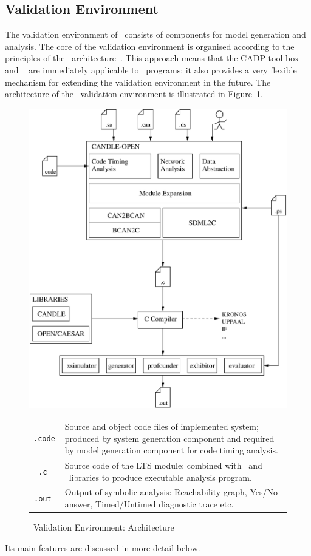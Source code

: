 \subsection{Validation Environment}
The validation environment of \candle\ consists of components for
model generation and analysis. The core of the validation environment is
organised according to the principles of the \opencaesar\
architecture~\cite{gar:98}. This approach means that 
the CADP tool box~\cite{fgk:96} and 
\openkronos~\cite{tri:98} are immediately applicable to \candle\
programs; it also provides a very flexible mechanism for extending the
validation environment in the future.  The architecture of the
\candle\ validation environment is illustrated in
Figure~\ref{fig:prmodelgen}. 
\begin{figure}
\begin{minipage}{\textwidth}
\begin{center}
\includegraphics[width=.6\linewidth]{PRACTICE/candle2.eps}
\end{center}

\medskip
\begin{center}
\begin{tabular}{|>{\tt}c|p{.75\linewidth}|}
\hline
.code & Source and object code files of implemented system; produced by system generation component and required by model generation component for code 
timing analysis. \\
.c & Source code of the LTS module; combined with \candle\ and \opencaesar\
 libraries to produce executable analysis program. \\
.out & Output of symbolic analysis: Reachability graph, Yes/No answer, Timed/Untimed diagnostic trace etc. \\
\hline
\end{tabular}
\end{center}
\end{minipage}
\caption{\candle\ Validation Environment: Architecture\label{fig:prmodelgen}}
\end{figure}
Its main features are discussed in more detail below.

